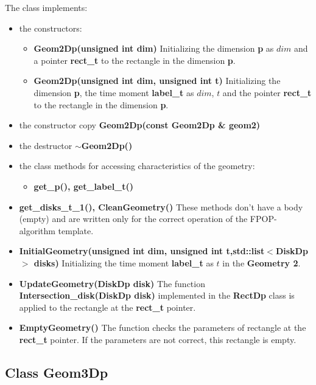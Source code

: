 \documentclass{report}
\begin{document}
	The class implements:
	\begin{itemize}	
		\item the constructors:
		\begin{itemize}
			\item {\bfseries Geom2Dp(unsigned  int dim)} 
			Initializing the dimension {\bfseries p} as $dim$  and a pointer {\bfseries rect\_t} to the rectangle in the dimension {\bfseries p}.
			\item {\bfseries Geom2Dp(unsigned int dim, unsigned int t)} 
			Initializing the dimension {\bfseries p}, the time moment {\bfseries label\_t} as $dim$, $t$   and the pointer {\bfseries rect\_t} to the rectangle in the dimension {\bfseries p}.
		\end{itemize}
		\item the constructor copy {\bfseries Geom2Dp(const Geom2Dp \& geom2)} 
		\item the destructor {\bfseries  $\sim$Geom2Dp()}
		\item the class methods for accessing characteristics of the geometry:
		\begin{itemize}
			\item {\bfseries get\_p(), get\_label\_t()}		
		\end{itemize}
		\item{\bfseries get\_disks\_t\_1(), CleanGeometry()}
		These methods don't have a body (empty) and are written only for the correct operation of the FPOP-algorithm template. 
		\item{\bfseries InitialGeometry(unsigned int dim, unsigned int t,std::list$<$DiskDp$>$ disks)}
		Initializing the time moment {\bfseries label\_t} as $t$ in the {\bfseries Geometry 2}. 
		\item {\bfseries UpdateGeometry(DiskDp disk)} 
		The function {\bfseries Intersection\_disk(DiskDp disk)} implemented in the {\bfseries RectDp} class is applied to the rectangle  at the {\bfseries rect\_t} pointer. 
		\item {\bfseries EmptyGeometry()}
		The function checks the parameters of rectangle at the {\bfseries rect\_t} pointer. If the parameters are not correct, this rectangle is empty. 
		
	\end{itemize}
	
	\subsection*{Class Geom3Dp}
	\label{Geom3Dp}
\end{document}
